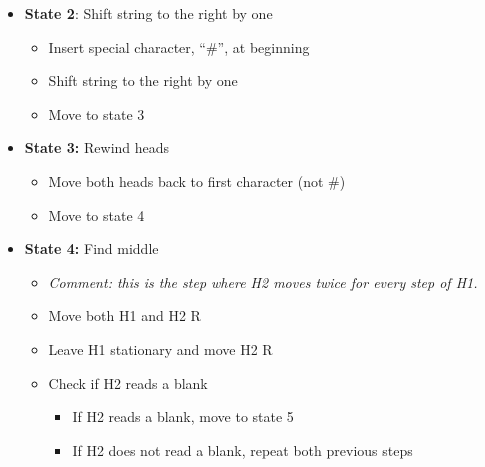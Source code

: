 \documentclass[12pt]{article}
\begin{document}
\begin{itemize}
\begin{itemize}
\begin{itemize}
	\end{itemize}\vspace{.2in}
	\item \textbf{State 2}: Shift string to the right by one
	\begin{itemize}
	\item Insert special character, ``\#'', at beginning
	\item Shift string to the right by one
	\item Move to state 3
	\end{itemize}\vspace{.2in}
	\item \textbf{State 3:} Rewind heads
	\begin{itemize}
	\item Move both heads back to first character (not \#)
	\item Move to state 4
	\end{itemize}\vspace{.2in}
	\item \textbf{State 4:} Find middle
	\begin{itemize}
	\item[] \textit{Comment: this is the step where H2 moves twice for every step of H1.}
	\item Move both H1 and H2 R
	\item Leave H1 stationary and move H2 R
	\item Check if H2 reads a blank
	\begin{itemize}
	\item If H2 reads a blank, move to state 5
	\item If H2 does not read a blank, repeat both previous steps
	\end{itemize}
	

\end{itemize}
\end{itemize}
\end{itemize}
\end{document}
